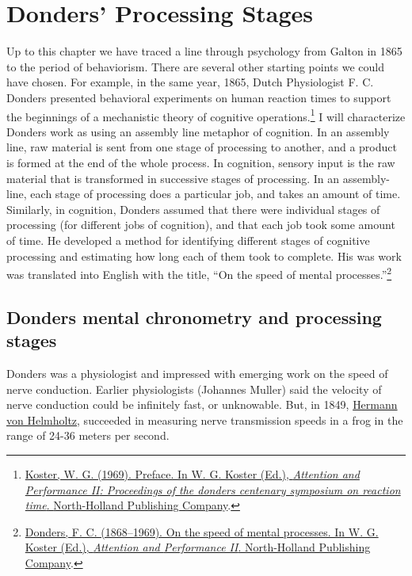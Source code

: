 \documentclass[
  oneside,
  12pt]{crumpbook}
\begin{document}
\hypertarget{donders-processing-stages}{%
\section{Donders' Processing Stages}\label{donders-processing-stages}}

Up to this chapter we have traced a line through psychology from Galton in 1865 to the period of behaviorism. There are several other starting points we could have chosen. For example, in the same year, 1865, Dutch Physiologist F. C. Donders presented behavioral experiments on human reaction times to support the beginnings of a mechanistic theory of cognitive operations.\footnote{\protect\hyperlink{ref-kosterPreface1969}{Koster, W. G. (1969). Preface. In W. G. Koster (Ed.), \emph{Attention and {Performance II}: Proceedings of the donders centenary symposium on reaction time}. {North-Holland Publishing Company}}.} I will characterize Donders work as using an assembly line metaphor of cognition. In an assembly line, raw material is sent from one stage of processing to another, and a product is formed at the end of the whole process. In cognition, sensory input is the raw material that is transformed in successive stages of processing. In an assembly-line, each stage of processing does a particular job, and takes an amount of time. Similarly, in cognition, Donders assumed that there were individual stages of processing (for different jobs of cognition), and that each job took some amount of time. He developed a method for identifying different stages of cognitive processing and estimating how long each of them took to complete. His was work was translated into English with the title, ``On the speed of mental processes.''\footnote{\protect\hyperlink{ref-dondersSpeedMentalProcesses1868}{Donders, F. C. (1868--1969). On the speed of mental processes. In W. G. Koster (Ed.), \emph{Attention and {Performance II}}. {North-Holland Publishing Company}}.}

\hypertarget{donders-mental-chronometry-and-processing-stages}{%
\subsection{Donders mental chronometry and processing stages}\label{donders-mental-chronometry-and-processing-stages}}

Donders was a physiologist and impressed with emerging work on the speed of nerve conduction. Earlier physiologists (Johannes Muller) said the velocity of nerve conduction could be infinitely fast, or unknowable. But, in 1849, \href{https://en.wikipedia.org/wiki/Hermann_von_Helmholtz}{Hermann von Helmholtz}, succeeded in measuring nerve transmission speeds in a frog in the range of 24-36 meters per second.
\end{document}
